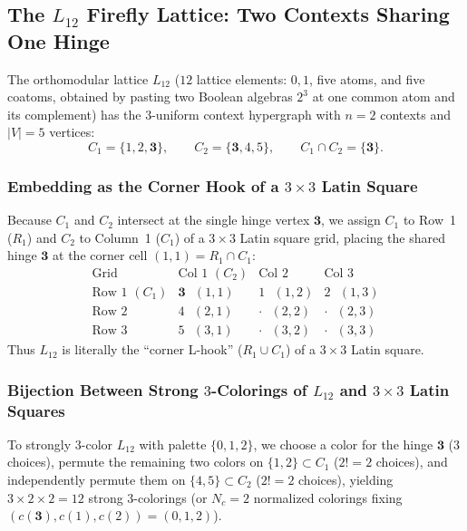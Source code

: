 \documentclass[aps,pra,reprint,superscriptaddress,longbibliography,nofootinbib,floatfix,10pt]{revtex4-2}
\theoremstyle{definition}\newtheorem{definition}[theorem]{Definition}
\theoremstyle{remark}\newtheorem{remark}[theorem]{Remark}
\begin{document}
\subsection{The \texorpdfstring{$L_{12}$}{L12} Firefly Lattice: Two Contexts Sharing One Hinge}\label{sec:L12}

The orthomodular lattice $L_{12}$ ($12$ lattice elements: $0,1$, five atoms, and five coatoms, obtained by pasting two Boolean algebras $2^3$ at one common atom and its complement) has the $3$-uniform context hypergraph with $n=2$ contexts and $|V|=5$ vertices:
\begin{equation}\label{eq:L12}
C_1=\{1,2,\mathbf{3}\},\qquad C_2=\{\mathbf{3},4,5\},\qquad C_1\cap C_2=\{\mathbf{3}\}.
\end{equation}

\subsubsection{Embedding as the Corner Hook of a \texorpdfstring{$3\times 3$}{3x3} Latin Square}
Because $C_1$ and $C_2$ intersect at the single hinge vertex $\mathbf{3}$, we assign $C_1$ to Row~1 ($R_1$) and $C_2$ to Column~1 ($C_1$) of a $3\times 3$ Latin square grid, placing the shared hinge $\mathbf{3}$ at the corner cell $(1,1)=R_1\cap C_1$:
\begin{equation}\label{eq:L12-grid}
\begin{array}{c|ccc}
\text{Grid} & \text{Col 1 }(C_2) & \text{Col 2} & \text{Col 3}\\\hline
\text{Row 1 }(C_1) & \mathbf{3}\text{ }(1,1) & 1\text{ }(1,2) & 2\text{ }(1,3)\\
\text{Row 2} & 4\text{ }(2,1) & \cdot\text{ }(2,2) & \cdot\text{ }(2,3)\\
\text{Row 3} & 5\text{ }(3,1) & \cdot\text{ }(3,2) & \cdot\text{ }(3,3)
\end{array}
\end{equation}
Thus $L_{12}$ is literally the ``corner L-hook'' ($R_1\cup C_1$) of a $3\times 3$ Latin square.

\subsubsection{Bijection Between Strong \texorpdfstring{$3$}{3}-Colorings of \texorpdfstring{$L_{12}$}{L12} and \texorpdfstring{$3\times 3$}{3x3} Latin Squares}
To strongly $3$-color $L_{12}$ with palette $\{0,1,2\}$, we choose a color for the hinge $\mathbf{3}$ ($3$ choices), permute the remaining two colors on $\{1,2\}\subset C_1$ ($2!=2$ choices), and independently permute them on $\{4,5\}\subset C_2$ ($2!=2$ choices), yielding $3\times 2\times 2=12$ strong $3$-colorings (or $N_c=2$ normalized colorings fixing $(c(\mathbf{3}),c(1),c(2))=(0,1,2)$).
\end{document}
